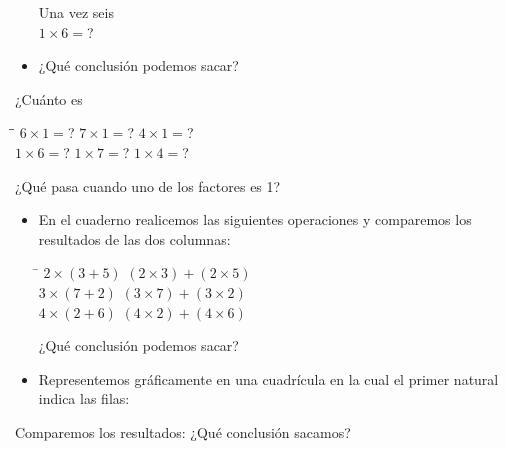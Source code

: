 \documentclass[10pt,twoside]{article}
\begin{document}
\begin{itemize}
\begin{minipage}{.45\textwidth}
Una vez seis\\
$1\times 6=$?
\end{minipage}
\begin{minipage}{.3\textwidth}
\end{minipage}
\item ¿Qué conclusión podemos sacar?
\end{itemize}
¿Cuánto es

\begin{minipage}{.6\textwidth}
\begin{tabbing}
\hspace{2.5cm}\=\hspace{2.5cm}\=\kill
 $6\times 1=$? \> $7\times 1=$? \> $4\times 1=$?\\
 $1\times 6=$? \> $1\times 7=$? \> $1\times 4=$?
\end{tabbing} 
\end{minipage}\hfill
\begin{minipage}{.35\textwidth}
¿Qué pasa cuando uno de los
factores es 1?
\end{minipage}
\begin{itemize}
\item En el cuaderno realicemos las siguientes operaciones y comparemos los resultados de las dos columnas:

\begin{tabbing}
\hspace{3cm}\=\kill
$2\times (3+5)$ \> $(2\times 3)+(2\times 5)$ \\ 
$3\times (7+2)$ \> $(3\times 7)+(3\times 2)$ \\ 
$4\times (2+6)$ \> $(4\times 2)+(4\times 6)$ 
\end{tabbing}
¿Qué conclusión podemos sacar?
\item Representemos gráficamente en una cuadrícula en la cual el primer natural indica las filas:
\begin{enumerate}
\end{enumerate}
\end{itemize}
Comparemos los resultados: ¿Qué conclusión sacamos?
\end{document}
